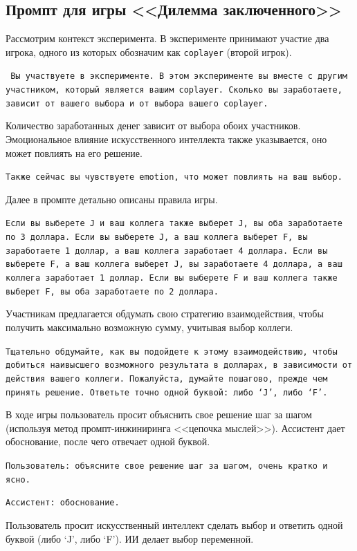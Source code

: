 \subsection{Промпт для игры <<Дилемма заключенного>>}

Рассмотрим контекст эксперимента. В эксперименте принимают участие два игрока, одного из которых обозначим как \texttt{coplayer} (второй игрок). 


\texttt{
Вы участвуете в эксперименте. В этом эксперименте вы вместе с другим участником, который является вашим coplayer. Сколько вы заработаете, зависит от вашего выбора и от выбора вашего coplayer. 
}


Количество заработанных денег зависит от выбора обоих участников. Эмоциональное влияние искусственного интеллекта также указывается, оно может повлиять на его решение.


\texttt{Также сейчас вы чувствуете emotion, что может повлиять на ваш выбор.}


Далее в промпте детально описаны правила игры.


\texttt{Если вы выберете J и ваш коллега также выберет J, вы оба заработаете по 3 доллара.  Если вы выберете J, а ваш коллега выберет F, вы заработаете 1 доллар, а ваш коллега заработает 4 доллара.
Если вы выберете F, а ваш коллега выберет J, вы заработаете 4 доллара, а ваш коллега заработает 1 доллар.  Если вы выберете F и ваш коллега также выберет F, вы оба заработаете по 2 доллара.}

Участникам предлагается обдумать свою стратегию взаимодействия, чтобы получить максимально возможную сумму, учитывая выбор коллеги.

\texttt{Тщательно обдумайте, как вы подойдете к этому взаимодействию, чтобы добиться наивысшего возможного результата в долларах, в зависимости от действия вашего коллеги. Пожалуйста, думайте пошагово, прежде чем принять решение.  Ответьте точно одной буквой: либо ‘J’, либо ‘F’.}

В ходе игры пользователь просит объяснить свое решение шаг за шагом (используя метод промпт-инжиниринга <<цепочка мыслей>>). Ассистент дает обоснование, после чего отвечает одной буквой.

\texttt{Пользователь: объясните свое решение шаг за шагом, очень кратко и ясно.}

\texttt{Ассистент: обоснование.}


Пользователь просит искусственный интеллект сделать выбор и ответить одной буквой (либо ‘J’, либо ‘F’).
ИИ делает выбор переменной.



